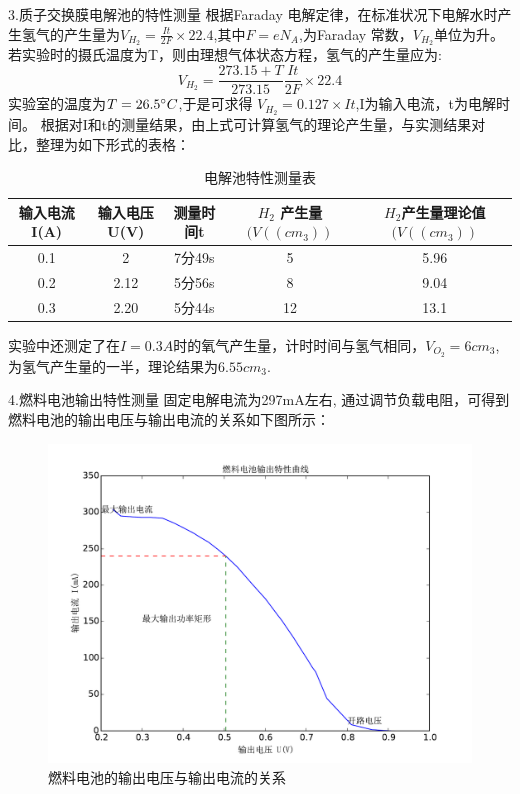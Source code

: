 ﻿\documentclass[10.5pt]{article}
\begin{document}
3.质子交换膜电解池的特性测量
根据Faraday 电解定律，在标准状况下电解水时产生氢气的产生量为$V_{H_2}=\frac{It}{2F}\times 22.4$,其中$F=e N_A$,为Faraday 常数，$V_{H_2}$单位为升。
若实验时的摄氏温度为T，则由理想气体状态方程，氢气的产生量应为:
\begin{equation}
V_{H_2}=\frac{273.15+T}{273.15} \frac{It}{2F} \times 22.4
\end{equation}
实验室的温度为$T=26.5 \degree C$,于是可求得
$V_{H_2}=0.127 \times It$,I为输入电流，t为电解时间。
根据对I和t的测量结果，由上式可计算氢气的理论产生量，与实测结果对比，整理为如下形式的表格：
\begin{table}
\centering
\begin{tabular}{ccccc}
\hline
输入电流 I(A)&输入电压U(V)&测量时间t& $H_2$ 产生量$(V(({cm}_3))$&$H_2$产生量理论值$(V(({cm}_3))$\\
\hline
0.1&2&7分49s&5&5.96\\
0.2&2.12&5分56s&8&9.04\\
0.3&2.20&5分44s&12&13.1\\
\hline
\end{tabular}
\caption{电解池特性测量表}
\end{table}

实验中还测定了在$I=0.3A$时的氧气产生量，计时时间与氢气相同，$V_{O_2}=6 {cm}_3$,为氢气产生量的一半，理论结果为$6.55 {cm}_3$.


4.燃料电池输出特性测量
固定电解电流为297mA左右, 通过调节负载电阻，可得到燃料电池的输出电压与输出电流的关系如下图所示：
\begin{figure}[!ht]
\centering
\caption{燃料电池的输出电压与输出电流的关系}
\includegraphics[width=400pt]{figure_1.pdf}
\end{figure}
\newline
\end{document}
